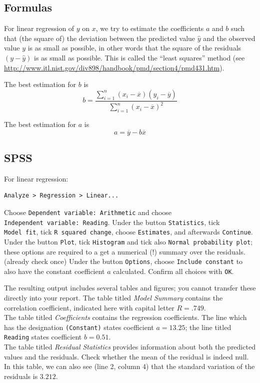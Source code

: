 \documentclass[
]{book}
\begin{document}
\hypertarget{sec:regression-formulas}{%
\subsection{Formulas}\label{sec:regression-formulas}}

For linear regression of \(y\) on \(x\), we try to estimate the coefficients \(a\)
and \(b\) such that (the square of) the deviation between the predicted value \(\hat{y}\)
and the observed value \(y\) is as small as possible, in other words that the
square of the residuals \((y-\hat{y})\) is as small as possible. This is called the
``least squares'' method (see
\url{http://www.itl.nist.gov/div898/handbook/pmd/section4/pmd431.htm}).

The best estimation for \(b\) is
\[b = \frac{ \sum_{i=1}^n (x_i-\overline{x})(y_i-\overline{y}) } { \sum_{i=1}^n (x_i-\overline{x})^2 }\]

The best estimation for \(a\) is \[a = \overline{y} - b \overline{x}\]

\hypertarget{spss-6}{%
\subsection{SPSS}\label{spss-6}}

For linear regression:

\begin{verbatim}
Analyze > Regression > Linear...
\end{verbatim}

Choose \texttt{Dependent\ variable:\ Arithmetic} and choose
\texttt{Independent\ variable:\ Reading}. Under the button \texttt{Statistics}, tick
\texttt{Model\ fit}, tick \texttt{R\ squared\ change}, choose \texttt{Estimates}, and afterwards
\texttt{Continue}.\\
Under the button \texttt{Plot}, tick \texttt{Histogram} and tick also
\texttt{Normal\ probability\ plot}; these options are required to a get a
numerical (!) summary over the residuals.~
(already check once)
Under the button \texttt{Options}, choose \texttt{Include\ constant} to also have
the constant coefficient \(a\) calculated. Confirm all choices with \texttt{OK}.

The resulting output includes several tables and figures; you cannot
transfer these directly into your report. The table titled \emph{Model
Summary} contains the correlation coefficient, indicated here with capital
letter \(R=.749\).\\
The table titled \emph{Coefficients} contains the regression coefficients. The
line which has the designation \texttt{(Constant)} states coefficient \(a=13.25\);
the line titled \texttt{Reading} states coefficient \(b=0.51\).\\
The table titled \emph{Residual Statistics} provides information about both
the predicted values and the residuals. Check whether the mean of the residual
is indeed null. In this table, we can also see (line 2, column 4) that
the standard variation of the residuals is \(3.212\).
\end{document}
